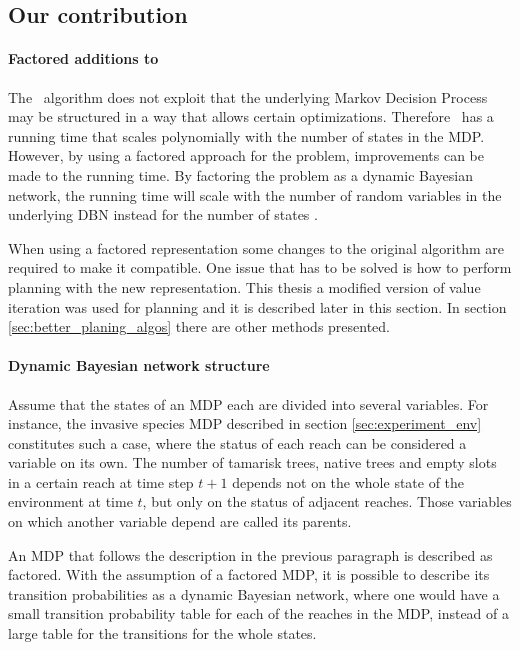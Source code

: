 \subsection{Our contribution}
\paragraph{Factored additions to \etre}
\label{sec:factored_e3}

The \etre\ algorithm does not exploit that the underlying Markov Decision Process may be structured in a way that allows certain optimizations. Therefore \etre\ has a running time that scales polynomially with the number of states in the MDP. However, by using a factored approach for the problem, improvements can be made to the running time. By factoring the problem as a dynamic Bayesian network, the running time will scale with the number of random variables in the underlying DBN instead for the number of states \parencite{kearns1999efficient}. 

When using a factored representation some changes to the original algorithm are required to make it compatible. One issue that has to be solved is how to perform  planning with the new representation. This thesis a modified version of value iteration was used for planning and it is described later in this section. In section \ref{sec:better_planing_algos} there are other methods presented.

\paragraph{Dynamic Bayesian network structure}

Assume that the states of an MDP each are divided into several variables. For
instance, the invasive species MDP described in section
\ref{sec:experiment_env} constitutes such a case, where the status of each
reach can be considered a variable on its own. The number of tamarisk trees,
native trees and empty slots in a certain reach at time step $t+1$ depends not
on the whole state of the environment at time $t$, but only on the status of
adjacent reaches. Those variables on which another variable depend are called
its parents.  

An MDP that follows the description in the previous paragraph is described as
factored. With the assumption of a factored MDP, it is possible to describe its
transition probabilities as a dynamic Bayesian network, where one would have a
small transition probability table for each of the reaches in the MDP, instead
of a large table for the transitions for the whole states.

